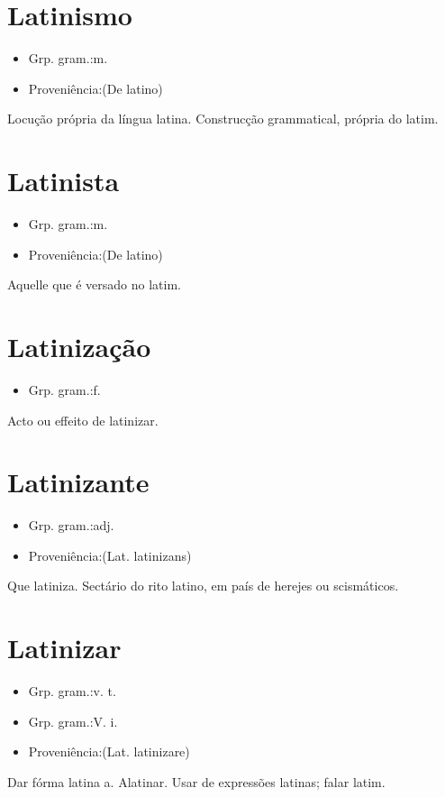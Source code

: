 \section{Latinismo}
\begin{itemize}
\item {Grp. gram.:m.}
\end{itemize}
\begin{itemize}
\item {Proveniência:(De \textunderscore latino\textunderscore )}
\end{itemize}
Locução própria da língua latina.
Construcção grammatical, própria do latim.
\section{Latinista}
\begin{itemize}
\item {Grp. gram.:m.}
\end{itemize}
\begin{itemize}
\item {Proveniência:(De \textunderscore latino\textunderscore )}
\end{itemize}
Aquelle que é versado no latim.
\section{Latinização}
\begin{itemize}
\item {Grp. gram.:f.}
\end{itemize}
Acto ou effeito de latinizar.
\section{Latinizante}
\begin{itemize}
\item {Grp. gram.:adj.}
\end{itemize}
\begin{itemize}
\item {Proveniência:(Lat. \textunderscore latinizans\textunderscore )}
\end{itemize}
Que latiniza.
Sectário do rito latino, em país de herejes ou scismáticos.
\section{Latinizar}
\begin{itemize}
\item {Grp. gram.:v. t.}
\end{itemize}
\begin{itemize}
\item {Grp. gram.:V. i.}
\end{itemize}
\begin{itemize}
\item {Proveniência:(Lat. \textunderscore latinizare\textunderscore )}
\end{itemize}
Dar fórma latina a.
Alatinar.
Usar de expressões latinas; falar latim.
